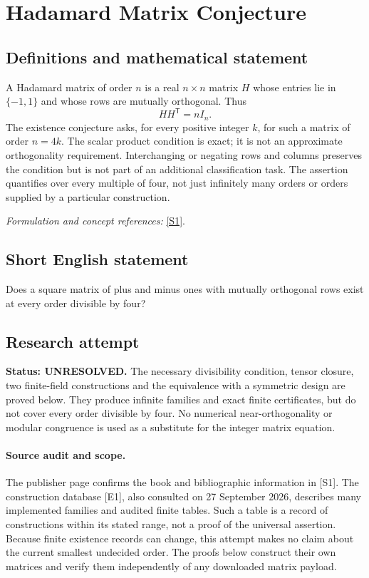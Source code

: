 \documentclass[11pt]{article}
\begin{document}
\section*{\texorpdfstring{Hadamard Matrix Conjecture}{Hadamard Matrix Conjecture}}\label{statement}
\subsection{Definitions and mathematical statement}
A Hadamard matrix of order $n$ is a real $n\times n$ matrix $H$ whose entries lie in $\{-1,1\}$ and whose rows are mutually orthogonal. Thus
\[
 HH^{\mathsf T}=nI_n.
\]
The existence conjecture asks, for every positive integer $k$, for such a matrix of order $n=4k$. The scalar product condition is exact; it is not an approximate orthogonality requirement. Interchanging or negating rows and columns preserves the condition but is not part of an additional classification task. The assertion quantifies over every multiple of four, not just infinitely many orders or orders supplied by a particular construction.
\par\smallskip\textit{Formulation and concept references:} \href{https://press.princeton.edu/books/hardcover/9780691119212/hadamard-matrices-and-their-applications}{[S1]}.

\subsection{Short English statement}
Does a square matrix of plus and minus ones with mutually orthogonal rows exist at every order divisible by four?
\subsection{Research attempt}
\textbf{Status: UNRESOLVED.} The necessary divisibility condition, tensor closure, two finite-field constructions and the equivalence with a symmetric design are proved below. They produce infinite families and exact finite certificates, but do not cover every order divisible by four. No numerical near-orthogonality or modular congruence is used as a substitute for the integer matrix equation.

\paragraph{Source audit and scope.}
The publisher page confirms the book and bibliographic information in [S1]. The construction database [E1], also consulted on 27 September 2026, describes many implemented families and audited finite tables. Such a table is a record of constructions within its stated range, not a proof of the universal assertion. Because finite existence records can change, this attempt makes no claim about the current smallest undecided order. The proofs below construct their own matrices and verify them independently of any downloaded matrix payload.
\end{document}
